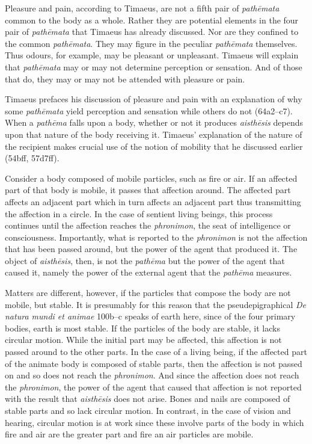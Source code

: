 Pleasure and pain, according to Timaeus, are not a fifth pair of \emph{pathēmata} common to the body as a whole. Rather they are potential elements in the four pair of \emph{pathēmata} that Timaeus has already discussed. Nor are they confined to the common \emph{pathēmata}. They may figure in the peculiar \emph{pathēmata} themselves. Thus odours, for example, may be pleasant or unpleasant. Timaeus will explain that \emph{pathēmata} may or may not determine perception or sensation. And of those that do, they may or may not be attended with pleasure or pain.

Timaeus prefaces his discussion of pleasure and pain with an explanation of why some \emph{pathēmata} yield perception and sensation while others do not (64a2--c7). When a \emph{pathēma} falls upon a body, whether or not it produces \emph{aisthēsis} depends upon that nature of the body receiving it. Timaeus' explanation of the nature of the recipient makes crucial use of the notion of mobility that he discussed earlier (54bff, 57d7ff). 

Consider a body composed of mobile particles, such as fire or air. If an affected part of that body is mobile, it passes that affection around. The affected part affects an adjacent part which in turn affects an adjacent part thus transmitting the affection in a circle. In the case of sentient living beings, this process continues until the affection reaches the \emph{phronimon}, the seat of intelligence or consciousness. Importantly, what is reported to the \emph{phronimon} is not the affection that has been passed around, but the power of the agent that produced it. The object of \emph{aisthēsis}, then, is not the \emph{pathēma} but the power of the agent that caused it, namely the power of the external agent that the \emph{pathēma} measures.

Matters are different, however, if the particles that compose the body are not mobile, but stable. It is presumably for this reason that the pseudepigraphical \emph{De natura mundi et animae} 100b--c speaks of earth here, since of the four primary bodies, earth is most stable. If the particles of the body are stable, it lacks circular motion. While the initial part may be affected, this affection is not passed around to the other parts. In the case of a living being, if the affected part of the animate body is composed of stable parts, then the affection is not passed on and so does not reach the \emph{phronimon}. And since the affection does not reach the \emph{phronimon}, the power of the agent that caused that affection is not reported with the result that \emph{aisthēsis} does not arise. Bones and nails are composed of stable parts and so lack circular motion. In contrast, in the case of vision and hearing, circular motion is at work since these involve parts of the body in which fire and air are the greater part and fire an air particles are mobile.

